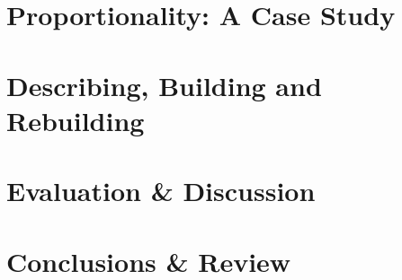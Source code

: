 \documentclass[10pt,oneside,a4paper,onecolumn,titlepage,draft]{lancsthesis}
\begin{document}
\chapter{Proportionality: A Case Study}
\label{sec:personal}


\chapter{Describing, Building and Rebuilding}
\label{sec:rebuilding}


\chapter{Evaluation \& Discussion}
\label{sec:evaluation}


\chapter{Conclusions \& Review}
\label{sec:conclusions}



\pagebreak%
%
\backmatter%



\pagebreak
\appendix
{}







\end{document}
